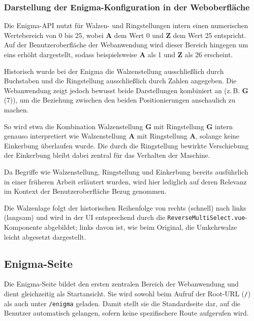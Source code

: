 \documentclass[12pt, ngerman, a4paper, numbers=noenddot]{article}
\begin{document}
\subsubsection*{Darstellung der Enigma-Konfiguration in der Weboberfläche}
Die Enigma-API nutzt für Walzen- und Ringstellungen intern einen numerischen Wertebereich von 0 bis 25, wobei \textbf{A} dem Wert 0 und \textbf{Z} dem Wert 25 entspricht. Auf der Benutzeroberfläche der Webanwendung wird dieser Bereich hingegen um eins erhöht dargestellt, sodass beispielsweise \textbf{A} als 1 und \textbf{Z} als 26 erscheint. 

Historisch wurde bei der Enigma die Walzenstellung ausschließlich durch Buchstaben und die Ringstellung ausschließlich durch Zahlen angegeben. Die Webanwendung zeigt jedoch bewusst beide Darstellungen kombiniert an (z.\,B. \textbf{G} (7)), um die Beziehung zwischen den beiden Positionierungen anschaulich zu machen. 

So wird etwa die Kombination Walzenstellung \textbf{G} mit Ringstellung \textbf{G} intern genauso interpretiert wie Walzenstellung \textbf{A} mit Ringstellung \textbf{A}, solange keine Einkerbung überlaufen wurde. Die durch die Ringstellung bewirkte Verschiebung der Einkerbung bleibt dabei zentral für das Verhalten der Maschine.

Da Begriffe wie Walzenstellung, Ringstellung und Einkerbung bereits ausführlich in einer früheren Arbeit erläutert wurden, wird hier lediglich auf deren Relevanz im Kontext der Benutzeroberfläche Bezug genommen.

Die Walzenlage folgt der historischen Reihenfolge von rechts (schnell) nach links (langsam) und wird in der UI entsprechend durch die \lstinline|ReverseMultiSelect.vue|-Komponente abgebildet; links davon ist, wie beim Original, die Umkehrwalze leicht abgesetzt dargestellt.



\subsection{Enigma-Seite}


Die Enigma-Seite bildet den ersten zentralen Bereich der Webanwendung und dient gleichzeitig als Startansicht. Sie wird sowohl beim Aufruf der Root-URL (\lstinline|/|) als auch unter \lstinline|/enigma| geladen. Damit stellt sie die Standardseite dar, auf die Benutzer automatisch gelangen, sofern keine spezifischere Route aufgerufen wird.
\end{document}
